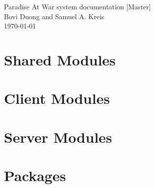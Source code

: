 \documentclass{report}
\begin{document}
\renewcommand{\thelstlisting}{\thesubsubsection.\arabic{lstlisting}}

\vspace*{256pt}
\begin{center}
    {\huge Paradise At War system documentation [Master]}\\[8pt]
    {\large Bovi Duong and Samuel A. Kreis}\\[4pt]
    \today
\end{center}

\newpage
\tableofcontents
\newpage


\newpage

\newpage

\newpage

\newpage

\newpage

\newpage



\newpage

\section{Shared Modules}
\newpage
\section{Client Modules}


\newpage
\section{Server Modules}

\newpage
\section{Packages}

\end{document}
